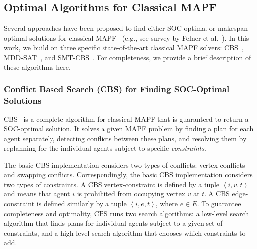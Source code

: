 \documentclass[review]{elsarticle}
\newcommand{\tuple}[1]{\ensuremath{\left \langle #1 \right \rangle }}
\newcommand\konstantin[1]{\nb{\textbf{Konstantin:}}{red}{#1}}
\newcommand\roni[1]{\nb{\textbf{Roni:}}{green}{#1}}
\newcommand\dor[1]{\nb{\textbf{Dor:}}{Fuchsia}{#1}}
\newcommand{\cbs}{\ac{CBS}\xspace}
\newcommand{\mddsat}{MDD-SAT\xspace}
\newcommand{\smtcbsO}{SMT-CBS\xspace} %
\newcommand{\mapf}{\ac{MAPF}\xspace}
\begin{document}

\subsection{Optimal Algorithms for Classical \mapf}
Several approaches have been proposed to find either SOC-optimal or makespan-optimal solutions for classical \mapf~ 
(e.g., see survey by Felner et al.~\cite{felner2017searchBased}). 
In this work, we build on three specific state-of-the-art classical \mapf solvers: \cbs~\cite{sharon2015conflict},   \mddsat~\cite{DBLP:conf/ecai/SurynekFSB16}, and \smtcbsO~\cite{DBLP:conf/ijcai/Surynek19}. 
For completeness, we provide a brief description of these algorithms here. 

\subsubsection{Conflict Based Search (CBS) for 
Finding SOC-Optimal Solutions}
\label{sec:cbs}

\cbs~\cite{sharon2015conflict} is a complete algorithm for classical \mapf that is guaranteed to return a SOC-optimal solution. 
It solves a given \mapf problem by finding a plan for each agent separately, detecting conflicts between these plans, and resolving them by replanning for the individual agents subject to specific \emph{constraints}. 

The basic \cbs implementation considers two types of conflicts: vertex conflicts and swapping conflicts. 
Correspondingly, the basic \cbs implementation considers two types of constraints. 
A \cbs vertex-constraint is defined by a tuple $\tuple{i,v,t}$ and means that agent $i$ is prohibited from occupying vertex $v$ at $t$.  
A \cbs edge-constraint is defined similarly by a tuple $\tuple{i,e,t}$, where $e\in E$. To guarantee completeness and optimality, \cbs runs two search algorithms: a low-level search algorithm that finds plans for individual agents subject to a given set of constraints, and a high-level search algorithm that chooses which constraints to add. 
\end{document}

